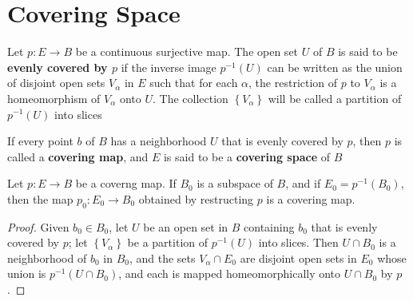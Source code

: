 \documentclass[12pt, a4paper, oneside]{book}
\begin{document}
\section{Covering Space} %
\begin{definition}
    Let $p : E \rightarrow B$ be a continuous surjective map. The open set $U$ of $B$ is said to be \textbf{evenly covered by $p$} if the inverse image
    $p^{-1}(U)$
    can be written as the union of disjoint open sets $V_\alpha$ in $E$ such that for each $\alpha$, the restriction of $p$ to $V_\alpha$ is a homeomorphism of $V_\alpha$ onto $U$.
    The collection $\left\{V_\alpha\right\}$ will be called a partition of $p^{-1}(U)$ into slices

    If every point $b$ of $B$ has a neighborhood $U$ that is evenly covered by $p$, then $p$ is called a \textbf{covering map}, and $E$ is said to be a \textbf{covering space} of $B$
\end{definition}



\begin{theorem}[Hereditarity]
    Let $p: E \rightarrow B$ be a coverng map. If $B_0$ is a subspace of $B$, and if $E_0=p^{-1}\left(B_0\right)$, then the map $p_0: E_0 \rightarrow B_0$ obtained by restructing $p$ is a covering map.
    \begin{proof}
        Given $b_0 \in B_0$, let $U$ be an open set in $B$ containing $b_0$ that is evenly covered by $p$; let $\left\{V_\alpha\right\}$ be a partition of $p^{-1}(U)$ into slices. Then $U \cap B_0$ is a neighborhood of $b_0$ in $B_0$, and the sets $V_\alpha \cap E_0$ are disjoint open sets in $E_0$ whose union is $p^{-1}\left(U \cap B_0\right)$, and each is mapped homeomorphically onto $U \cap B_0$ by $p$.
    \end{proof}
\end{theorem}
\end{document}
